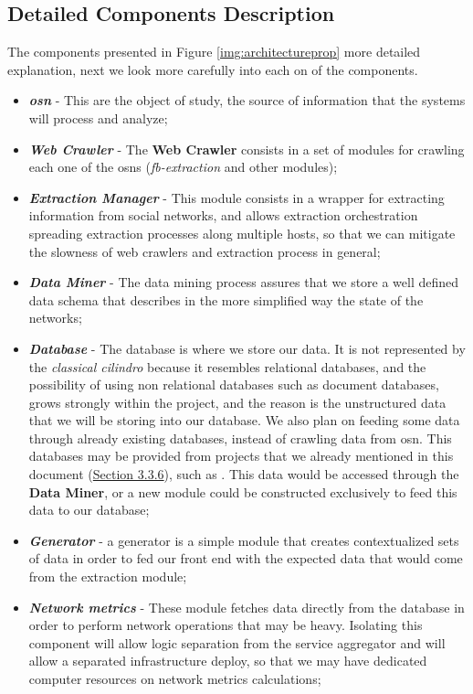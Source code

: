 \subsection{Detailed Components Description}
The components presented in Figure \ref{img:architectureprop} more detailed explanation, next we look more carefully into each on of the components.
\begin{itemize}
    \item \textbf{\textit{\acrfull{osn}}} - This are the object of study, the source of information that the systems will process and analyze;
    \item \textbf{\textit{Web Crawler}} - The \textbf{Web Crawler} consists in a set of modules for crawling each one of the \glspl{osn} (\textit{fb-extraction} and other modules);
    \item \textbf{\textit{Extraction Manager}} - This module consists in a wrapper for extracting information from social networks, and allows extraction orchestration spreading extraction processes along multiple hosts, so that we can mitigate the slowness of web crawlers and extraction process in general;
    \item \textbf{\textit{Data Miner}} - The data mining process assures that we store a well defined data schema that describes in the more simplified way the state of the networks;
    \item \textbf{\textit{Database}} - The database is where we store our data. It is not represented by the \textit{classical cilindro} because it resembles relational databases, and the possibility of using non relational databases such as document databases, grows strongly within the project, and the reason is the unstructured data that we will be storing into our database. We also plan on feeding some data through already existing databases, instead of crawling data from \gls{osn}. This databases may be provided from projects that we already mentioned in this document  (\hyperref[sec:otherdatasources]{Section 3.3.6}), such as \citep{kunegis2013konect}. This data would be accessed through the \textbf{Data Miner}, or a new module could be constructed exclusively to feed this data to our database;
    \item \textbf{\textit{Generator}} - a generator is a simple module that creates contextualized sets of data in order to fed our front end with the expected data that would come from the extraction module;
    \item \textbf{\textit{Network metrics}} - These module fetches data directly from the database in order to perform network operations that may be heavy. Isolating this component will allow logic separation from the service aggregator and will allow a separated infrastructure deploy, so that we may have dedicated computer resources on network metrics calculations;

\end{itemize}
